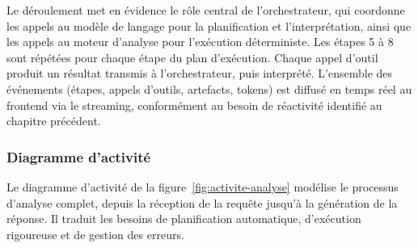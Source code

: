 Le déroulement met en évidence le rôle central de l'orchestrateur, qui coordonne les appels au modèle de langage pour la planification et l'interprétation, ainsi que les appels au moteur d'analyse pour l'exécution déterministe. Les étapes 5 à 8 sont répétées pour chaque étape du plan d'exécution. Chaque appel d'outil produit un résultat transmis à l'orchestrateur, puis interprété. L'ensemble des événements (étapes, appels d'outils, artefacts, tokens) est diffusé en temps réel au frontend via le streaming, conformément au besoin de réactivité identifié au chapitre précédent.

\subsubsection{Diagramme d'activité}

Le diagramme d'activité de la figure~\ref{fig:activite-analyse} modélise le processus d'analyse complet, depuis la réception de la requête jusqu'à la génération de la réponse. Il traduit les besoins de planification automatique, d'exécution rigoureuse et de gestion des erreurs.

